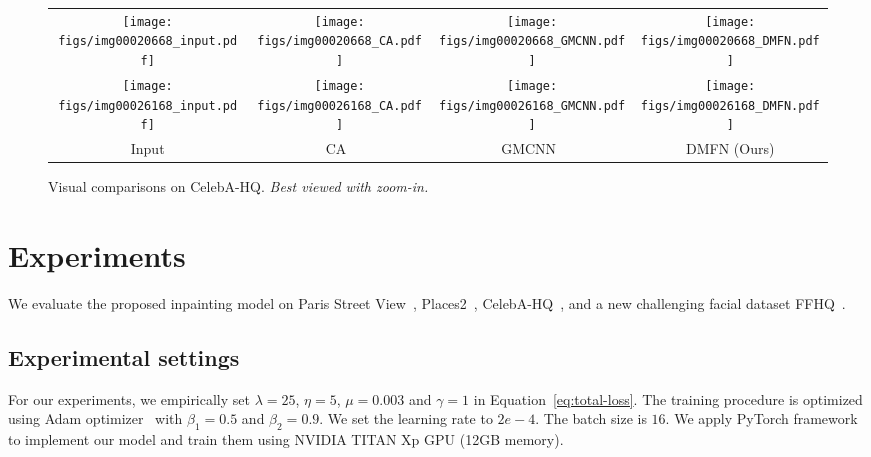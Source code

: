 \documentclass[journal]{IEEEtran}
\begin{document}
\begin{figure}[htpb]
	\centering
	\begin{adjustbox}{valign=t}
		\begin{tabular}{cccc}
			\texttt{[image: figs/img00020668\_input.pdf]} &
			\hspace{-4mm}
			\texttt{[image: figs/img00020668\_CA.pdf]} &
			\hspace{-4mm}
			\texttt{[image: figs/img00020668\_GMCNN.pdf]} &
			\hspace{-4mm}
			\texttt{[image: figs/img00020668\_DMFN.pdf]} \\
			
			
			\texttt{[image: figs/img00026168\_input.pdf]} &
			\hspace{-4mm}
			\texttt{[image: figs/img00026168\_CA.pdf]} &
			\hspace{-4mm}
			\texttt{[image: figs/img00026168\_GMCNN.pdf]} &
			\hspace{-4mm}
			\texttt{[image: figs/img00026168\_DMFN.pdf]} \\
			
			Input &\hspace{-4mm} CA~\cite{contextual-attention} &\hspace{-4mm} GMCNN~\cite{GMCNN} &\hspace{-4mm} DMFN (Ours) \\
		\end{tabular}
	\end{adjustbox}
	\caption{Visual comparisons on CelebA-HQ. \textit{Best viewed with zoom-in.}}
	\label{fig:celeba-hq}
\end{figure}

\section{Experiments}\label{sec:experiments}
We evaluate the proposed inpainting model on Paris Street View~\cite{CE}, Places2~\cite{places2}, CelebA-HQ~\cite{celeba-hq}, and a new challenging facial dataset FFHQ~\cite{ffhq}.

\subsection{Experimental settings}
For our experiments, we empirically set $\lambda = 25$, $\eta = 5$, $\mu = 0.003$ and $\gamma = 1$ in Equation~\ref{eq:total-loss}. The training procedure is optimized using Adam optimizer~\cite{Adam} with ${\beta _1} = 0.5$ and ${\beta _2} = 0.9$. We set the learning rate to $2e - 4$. The batch size is $16$. We apply PyTorch framework to implement our model and train them using NVIDIA TITAN Xp GPU (12GB memory). 
\end{document}
